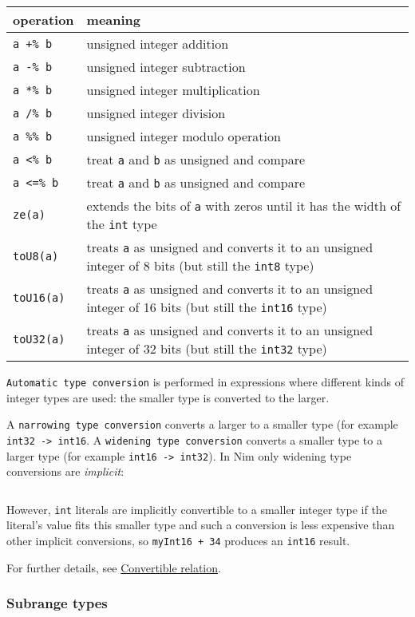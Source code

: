 \begin{longtable}[]{@{}ll@{}}
\toprule
operation & meaning\tabularnewline
\midrule
\endhead
\texttt{a\ +\%\ b} & unsigned integer addition\tabularnewline
\texttt{a\ -\%\ b} & unsigned integer subtraction\tabularnewline
\texttt{a\ *\%\ b} & unsigned integer multiplication\tabularnewline
\texttt{a\ /\%\ b} & unsigned integer division\tabularnewline
\texttt{a\ \%\%\ b} & unsigned integer modulo operation\tabularnewline
\texttt{a\ \textless{}\%\ b} & treat \texttt{a} and \texttt{b} as
unsigned and compare\tabularnewline
\texttt{a\ \textless{}=\%\ b} & treat \texttt{a} and \texttt{b} as
unsigned and compare\tabularnewline
\texttt{ze(a)} & extends the bits of \texttt{a} with zeros until it has
the width of the \texttt{int} type\tabularnewline
\texttt{toU8(a)} & treats \texttt{a} as unsigned and converts it to an
unsigned integer of 8 bits (but still the \texttt{int8}
type)\tabularnewline
\texttt{toU16(a)} & treats \texttt{a} as unsigned and converts it to an
unsigned integer of 16 bits (but still the \texttt{int16}
type)\tabularnewline
\texttt{toU32(a)} & treats \texttt{a} as unsigned and converts it to an
unsigned integer of 32 bits (but still the \texttt{int32}
type)\tabularnewline
\bottomrule
\end{longtable}

\texttt{Automatic\ type\ conversion} is performed in expressions where
different kinds of integer types are used: the smaller type is converted
to the larger.

A \texttt{narrowing\ type\ conversion} converts a larger to a smaller
type (for example \texttt{int32\ -\textgreater{}\ int16}. A
\texttt{widening\ type\ conversion} converts a smaller type to a larger
type (for example \texttt{int16\ -\textgreater{}\ int32}). In Nim only
widening type conversions are \emph{implicit}:

\begin{verbatim}
\end{verbatim}

However, \texttt{int} literals are implicitly convertible to a smaller
integer type if the literal's value fits this smaller type and such a
conversion is less expensive than other implicit conversions, so
\texttt{myInt16\ +\ 34} produces an \texttt{int16} result.

For further details, see
\protect\hyperlink{type-relations-convertible-relation}{Convertible
relation}.

\hypertarget{subrange-types}{%
\subsubsection{Subrange types}\label{subrange-types}}

